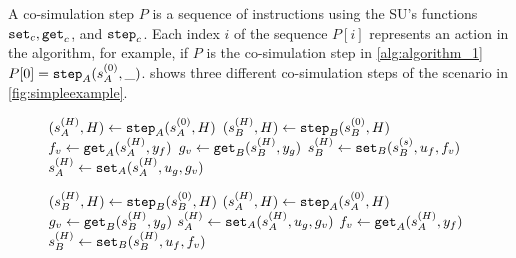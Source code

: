 A co-simulation step $P$  is a sequence of instructions using the SU's functions $\mathtt{set}_{c},\mathtt{get}_{c}$, and $\mathtt{step}_{c}$. Each index $i$ of the sequence $P[i]$ represents an action in the algorithm, for example, if $P$ is the co-simulation step in \cref{alg:algorithm_1} $P[0] = \mathtt{step}_{A}(s_{A}^{(0)}, \_)$.  shows three different co-simulation steps of the scenario in \cref{fig:simpleexample}. 
\vspace{-1em}
\begin{figure}[htb]
  \centering
  \begin{minipage}[t]{.325\textwidth}
    \begin{algorithm}[H]
      \caption{}
      \label{alg:algorithm_1}
      \begin{algorithmic}[1]
        \scriptsize
        \State $(s_{A}^{(H)},H) \gets \mathtt{step}_{A}(s_{A}^{(0)}, H)$
        \State $(s_{B}^{(H)},H) \gets \mathtt{step}_{B}(s_{B}^{(0)}, H)$
        \State $f_{v} \gets \mathtt{get}_{A}(s_{A}^{(H)}, y_{f})$
        \State $g_{v} \gets \mathtt{get}_{B}(s_{B}^{(H)}, y_{g})$
        \State $s_{B}^{(H)} \gets \mathtt{set}_{B}(s_{B}^{(s)}, u_{f}, f_{v})$
        \State $s_{A}^{(H)} \gets \mathtt{set}_{A}(s_{A}^{(H)},u_{g},g_{v})$
      \end{algorithmic}
    \end{algorithm}
  \end{minipage}
  \begin{minipage}[t]{0.325\textwidth}
    \begin{algorithm}[H]
      \caption{}
      \label{alg:algorithm_2}
      \begin{algorithmic}[1]
        \scriptsize
        \State $(s_{B}^{(H)},H) \gets \mathtt{step}_{B}(s_{B}^{(0)}, H)$
        \State $(s_{A}^{(H)},H) \gets \mathtt{step}_{A}(s_{A}^{(0)}, H)$
        \State $g_v \gets \mathtt{get}_{B}(s_{B}^{(H)}, y_{g})$
        \State $s_{A}^{(H)} \gets \mathtt{set}_{A}(s_{A}^{(H)}, u_{g}, g_v)$
        \State $f_v \gets \mathtt{get}_{A}(s_{A}^{(H)}, y_{f})$
        \State $s_{B}^{(H)} \gets \mathtt{set}_{B}(s_{B}^{(H)}, u_{f}, f_v)$
      \end{algorithmic}
    \end{algorithm}
  \end{minipage}
  \begin{minipage}[t]{0.325\textwidth}
    \begin{algorithm}[H]
      \caption{}
      \label{alg:algorithm_3}

\end{algorithm}
\end{minipage}
\end{figure}
